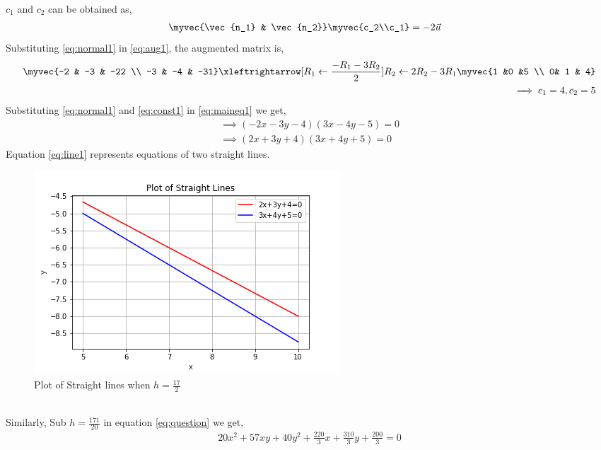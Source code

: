 $c_1$ and $c_2$ can be obtained as,
\begin{align}
\myvec{\vec{n_1} & \vec{n_2}}\myvec{c_2\\c_1}&=-2\vec{u} \label{eq:aug1}
\end{align}
Substituting \eqref{eq:normal1} in \eqref{eq:aug1}, the augmented matrix is,
\begin{align}
\myvec{-2 & -3 & -22 \\ -3 & -4 & -31}
\xleftrightarrow[R_1\leftarrow \frac{-R_1-3R_2}{2}]{R_2\leftarrow 2R_2-3R_1}
\myvec{1 &0 &5 \\ 0& 1 & 4} \label{eq:aug2}\\
\implies c_1 = 4, c_2=5 \label{eq:const1}
\end{align}
Substituting \eqref{eq:normal1} and \eqref{eq:const1} in \eqref{eq:maineq1} we get,
\begin{multline}
\implies (-2x-3y-4)(3x-4y-5) = 0\\
\implies \boxed{(2x+3y+4)(3x+4y+5) = 0} \label{eq:line1}
\end{multline}
Equation \eqref{eq:line1} represents equations of two straight lines.\\
\renewcommand{\thefigure}{\arabic{figure}}
\begin{figure}[h!]
	\centering
	\includegraphics[width=\columnwidth]{./solutions/13/ex2/st1.png}
	\caption{Plot of Straight lines when $h=\frac{17}{2}$}
	\label{myfig}
\end{figure}\\








Similarly, Sub $h=\frac{171}{20}$ in equation \eqref{eq:question} we get,
\begin{align}
20x^2+57xy+40y^2+\frac{220}{3}x+\frac{310}{3}y+\frac{200}{3}=0 \label{eq:op2}
\end{align}


